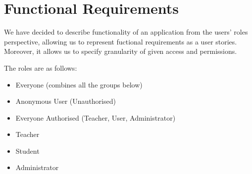 \documentclass[a4paper,11pt,twoside]{report}
\theoremstyle{definition}
\begin{document}
\chapter*{Functional Requirements}

We have decided to describe functionality of an application from the users' roles perspective, 
allowing us to represent fuctional requirements as a user stories.
Moreover, it allows us to specify granularity of given access and permissions.

The roles are as follows:
\begin{itemize}
\itemsep0em 
\addtolength{\itemindent}{0.5cm}
	\vspace{-0.2cm}\item Everyone (combines all the groups below)
    \vspace{-0.2cm}\item Anonymous User (Unauthorised)
	\vspace{-0.2cm}\item Everyone Authorised (Teacher, User, Administrator)
    \vspace{-0.2cm}\item Teacher
    \vspace{-0.2cm}\item Student
    \vspace{-0.2cm}\item Administrator
\end{itemize}
\end{document}
